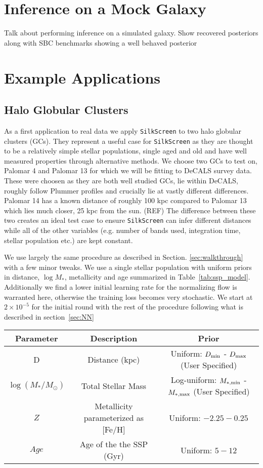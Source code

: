 \documentclass[twocolumn]{aastex631}
\newcommand{\code}[0]{\texttt{SilkScreen}}
\begin{document}
\section{Inference on a Mock Galaxy}
\label{self-test}
Talk about performing inference on a simulated galaxy. Show recovered posteriors along with SBC benchmarks showing a well behaved posterior

\section{Example Applications}
\subsection{Halo Globular Clusters}
\label{sec:gc}
As a first application to real data we apply \code{} to two halo globular clusters (GCs). They represent a useful case for \code{} as they are thought to be a relatively simple stellar populations, single aged and old and have well measured properties through alternative methods. We choose two GCs to test on, Palomar 4 and Palomar 13 for which we will be fitting to DeCALS survey data. These were choosen as they are both well studied GCs, lie within DeCALS, roughly follow Plummer profiles and crucially lie at vastly different differences. Palomar 14 has a known distance of roughly 100 kpc compared to Palomar 13 which lies much closer, 25 kpc from the sun. (REF) The difference between these two creates an ideal test case to ensure \code{} can infer different distances while all of the other variables (e.g. number of bands used, integration time, stellar population etc.) are kept constant.

We use largely the same procedure as described in Section. \ref{sec:walkthrough} with a few minor tweaks. We use a single stellar population with uniform priors in distance, $\log M_*$, metallicity and age summarized in Table~\ref{tab:ssp_model}. Additionally we find a lower initial learning rate for the normalizing flow is warranted here, otherwise the training loss becomes very stochastic. We start at $2\times 10^{-5}$ for the initial round with the rest of the procedure following what is described in section~\ref{sec:NN}

\begin{table*}
    \centering
    \caption{The parameters are priors for our SSP model parameterized used to model globular clusters}
    \small
    \begin{tabular}{c c c} 
        Parameter & Description & Prior \\  \hline \hline
         D & Distance (kpc) & Uniform: $D_{\rm min}$ -  $D_{\rm max}$ (User Specified) \\
         $\log (M_*/M_\odot)$ & Total Stellar Mass & Log-uniform: $M_{\rm*, min}$ -  $M_{\rm* , max}$ (User Specified) \\
         $Z$ & Metallicity parameterized as [Fe/H] & Uniform: $-2.25-0.25$ \\
         $Age$& Age of the the SSP (Gyr) & Uniform: $5-12$\\ \hline
    \end{tabular}
    \label{tab:ssp_model}
\end{table*}
\end{document}
